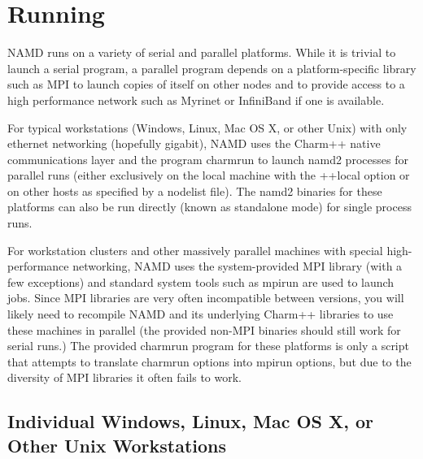 
\section{Running \NAMD}
\label{section:run}

NAMD runs on a variety of serial and parallel platforms.  While it is
trivial to launch a serial program, a parallel program depends on a
platform-specific library such as MPI to launch copies of itself on
other nodes and to provide access to a high performance network such
as Myrinet or InfiniBand if one is available.

For typical workstations (Windows, Linux, Mac OS X, or other Unix)
with only ethernet networking (hopefully gigabit), NAMD uses the
Charm++ native communications layer and the program charmrun to launch
namd2 processes for parallel runs (either exclusively on the local
machine with the ++local option or on other hosts as specified by a
nodelist file).  The namd2 binaries for these platforms can also be
run directly (known as standalone mode) for single process runs.

For workstation clusters and other massively parallel machines with
special high-performance networking, NAMD uses the system-provided
MPI library (with a few exceptions) and standard system tools such as
mpirun are used to launch jobs.  Since MPI libraries are very often
incompatible between versions, you will likely need to recompile NAMD
and its underlying Charm++ libraries to use these machines in parallel
(the provided non-MPI binaries should still work for serial runs.)
The provided charmrun program for these platforms is only a script
that attempts to translate charmrun options into mpirun options, but
due to the diversity of MPI libraries it often fails to work.

\subsection{Individual Windows, Linux, Mac OS X, or Other Unix Workstations}

